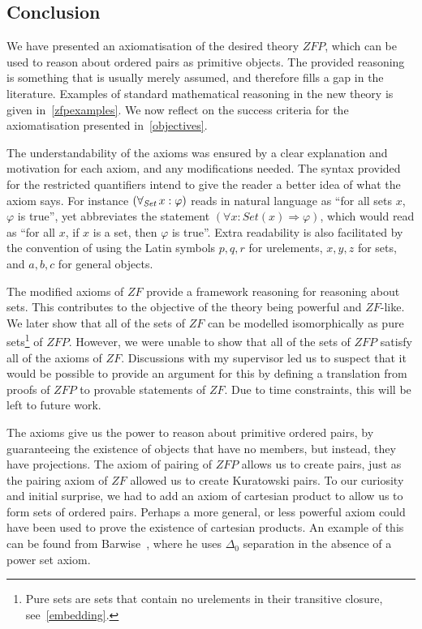 \documentclass[11pt]{report}
\newcommand{\all}[1]{\forall_{\mathit{#1}}\hspace{0.5mm}}
\theoremstyle{definition}
\theoremstyle{theorem}
\theoremstyle{lemma}
\begin{document}
\subsection{Conclusion}
We have presented an axiomatisation of the desired theory $\mathit{ZFP}$, which can be used to reason about ordered pairs as primitive objects.
The provided reasoning is something that is usually merely assumed, and therefore fills a gap in the literature.
Examples of standard mathematical reasoning in the new theory is given in~\ref{zfpexamples}. 
We now reflect on the success criteria for the axiomatisation presented in~\ref{objectives}.

The understandability of the axioms was ensured by a clear explanation and motivation for each axiom, and any modifications needed. 
The syntax provided for the restricted quantifiers intend to give the reader a better idea of what the axiom says.
For instance $(\all{Set} x: \varphi)$ reads in natural language as ``for all sets $x$, $\varphi$ is true'', yet abbreviates the statement $(\forall x: \mathit{Set}(x) \Rightarrow \varphi)$, which would read as ``for all $x$, if $x$ is a set, then $\varphi$ is true''.
Extra readability is also facilitated by the convention of using the Latin symbols $p,q,r$ for urelements, $x,y,z$ for sets, and $a,b,c$ for general objects.  

The modified axioms of $\mathit{ZF}$ provide a framework reasoning for reasoning about sets. 
This contributes to the objective of the theory being powerful and $\mathit{ZF}$-like.
We later show that all of the sets of $\mathit{ZF}$ can be modelled isomorphically as pure sets\footnote{Pure sets are sets that contain no urelements in their transitive closure, see~\ref{embedding}.} of $\mathit{ZFP}$.
However, we were unable to show that all of the sets of $\mathit{ZFP}$ satisfy all of the axioms of $\mathit{ZF}$.
Discussions with my supervisor led us to suspect that it would be possible to provide an argument for this by defining a translation from proofs of $\mathit{ZFP}$ to provable statements of $\mathit{ZF}$.   
Due to time constraints, this will be left to future work. 

The axioms give us the power to reason about primitive ordered pairs, by guaranteeing the existence of objects that have no members, but instead, they have projections.
The axiom of pairing of $\mathit{ZFP}$ allows us to create pairs, just as the pairing axiom of $\mathit{ZF}$ allowed us to create Kuratowski pairs. 
To our curiosity and initial surprise, we had to add an axiom of cartesian product to allow us to form sets of ordered pairs.
Perhaps a more general, or less powerful axiom could have been used to prove the existence of cartesian products. 
An example of this can be found from Barwise~\cite{barwise}, where he uses $\Delta_0$ separation in the absence of a power set axiom.  
\end{document}
